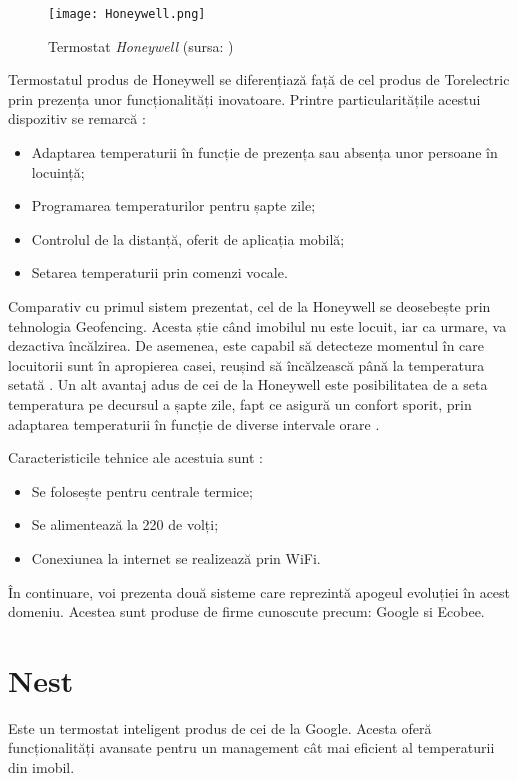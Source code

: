 \begin{wrapfigure}{l}{0.55\textwidth} 
	\centering
	\texttt{[image: Honeywell.png]}
	\caption{Termostat \textit{Honeywell} (sursa: \cite{honeywell})}
\end{wrapfigure}

	Termostatul produs de Honeywell se diferențiază față de cel produs de Torelectric prin prezența unor funcționalități inovatoare. Printre particularitățile acestui dispozitiv se remarcă \cite{honeywell}:
	\begin{itemize}
	\setlength{\itemindent}{2em}
		\itemsep0em
		\item Adaptarea temperaturii în funcție de prezența sau absența unor persoane în locuință; 
		\item Programarea temperaturilor pentru șapte zile;
		\item Controlul de la distanță, oferit de aplicația mobilă;
		\item Setarea temperaturii prin comenzi vocale.
	\end{itemize}

	Comparativ cu primul sistem prezentat, cel de la Honeywell se deosebește prin tehnologia Geofencing. Acesta știe când imobilul nu este locuit, iar ca urmare, va dezactiva încălzirea. De asemenea, este capabil să detecteze momentul în care locuitorii sunt în apropierea casei, reușind să încălzească până la temperatura setată \cite{honeywell}.
	Un alt avantaj adus de cei de la Honeywell este posibilitatea de a seta temperatura pe decursul a șapte zile, fapt ce asigură un confort sporit, prin adaptarea temperaturii în funcție de diverse intervale orare \cite{honeywell}.

	Caracteristicile tehnice ale acestuia sunt \cite{honeywell}:
	\begin{itemize}
	\setlength{\itemindent}{2em}
		\itemsep0em
		\item Se folosește pentru centrale termice;
		\item Se alimentează la 220 de volți;
		\item Conexiunea la internet se realizează prin WiFi.
	\end{itemize}

	În continuare, voi prezenta două sisteme care reprezintă apogeul evoluției în acest domeniu. Acestea sunt produse de firme cunoscute precum: Google si Ecobee.

\section{Nest}
	Este un termostat inteligent produs de cei de la Google. Acesta oferă funcționalități avansate pentru un management cât mai eficient al temperaturii din imobil. 

